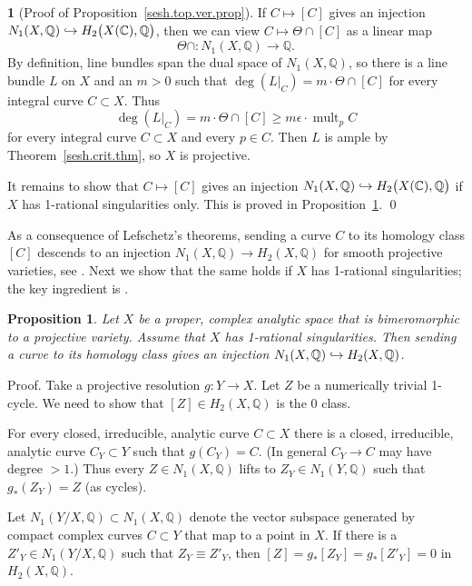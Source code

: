 \documentclass{amsart}
\newtheorem{prop}[thm]{Proposition}
\theoremstyle{definition}
\newtheorem{say}[thm]{}
\theoremstyle{remark}
\renewcommand{\c}[0]{{\mathbb C}}
\newcommand{\q}[0]{{\mathbb Q}}
\newcommand{\mult}[0]{\operatorname{mult}}
\def\into{\DOTSB\lhook\joinrel\to}
\begin{document}
 
 \begin{say}[Proof of Proposition~\ref{sesh.top.ver.prop}]\label{sesh.top.ver.prop.pf}
 If $C\mapsto [C]$ gives  an injection $N_1(X, \q)\into H_2\bigl(X(\c), \q\bigr)$, then we can view  $C\mapsto \Theta\cap [C]$ as a linear map
 $$
 \Theta\cap : N_1(X, \q)\to \q.
 $$
 By definition,  line bundles  span the dual space of $ N_1(X, \q)$, so
 there is a line bundle $L$ on $X$ and an $m>0$ such that
 $\deg(L|_C)=m\cdot \Theta\cap [C]$
 for every integral curve $C\subset X$. Thus
 $$
 \deg(L|_C)=m\cdot \Theta\cap [C]\geq m\epsilon \cdot \mult_pC
   $$
 for every integral curve $C\subset X$ and every $p\in C$.
 Then  $L$ is ample by Theorem~\ref{sesh.crit.thm}, so $X$ is projective.

  It remains to show that $C\mapsto [C]$ gives  an injection $N_1(X, \q)\into H_2\bigl(X(\c), \q\bigr)$ if $X$ has  1-rational singularities only. This is proved in Proposition~\ref{N1.to.H2.prop}. 
 \qed
 \end{say}

 

 
 As a consequence of Lefschetz's theorems, sending a curve $C$ to its homology class $[C]$ descends to an  injection  $N_1(X,\q)\to H_2(X, \q)$  for smooth projective varieties, see \cite[p.161]{gri-har}.
 Next we show that the same holds if $X$ has  1-rational singularities; the key ingredient is \cite[12.1.4]{km-flips}.




\begin{prop}\label{N1.to.H2.prop}
 Let $X$ be a proper, complex analytic space
that is bimeromorphic to a projective variety.
Assume that $X$ has  1-rational singularities. Then  sending a curve to its homology class gives an   injection  $N_1(X,\q)\into H_2(X, \q)$.
\end{prop}

Proof. Take a projective resolution $g:Y\to X$. Let $Z$ be a numerically trivial 1-cycle. We need to show that $[Z]\in H_2(X, \q)$ is the 0 class.


For every closed, irreducible, analytic curve
$C\subset X$ there is a closed, irreducible, analytic curve
$C_Y\subset Y$ such that $g(C_Y)=C$.  (In general $C_Y\to C$ may have degree $>1$.) Thus every $Z\in N_1(X, \q)$ lifts to $Z_Y\in N_1(Y,\q)$ such that
$g_*(Z_Y)=Z$ (as cycles).

Let $N_1(Y/X,\q)\subset N_1(X, \q)$ denote the vector subspace generated by
compact complex curves $C\subset Y$ that map to a point in $X$. 
If there is a $Z'_Y\in N_1(Y/X,\q)$ 
such that $Z_Y\equiv Z'_Y$, then 
$[Z]=g_*[Z_Y]=g_*[Z'_Y]=0$ in $H_2(X,\q)$. 
\end{document}
